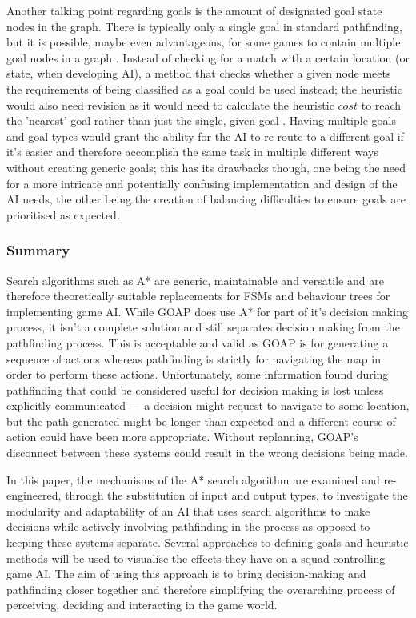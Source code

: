 \documentclass[11pt, a4paper]{article}
\begin{document}
Another talking point regarding goals is the amount of designated goal state nodes in the graph. There is typically only a single goal in standard pathfinding, but it is possible, maybe even advantageous, for some games to contain multiple goal nodes in a graph \parencite[272]{millington2019ai}. Instead of checking for a match with a certain location (or state, when developing AI), a method that checks whether a given node meets the requirements of being classified as a goal could be used instead; the heuristic would also need revision as it would need to calculate the heuristic $cost$ to reach the 'nearest' goal rather than just the single, given goal \parencite[272]{millington2019ai}. Having multiple goals and goal types \parencite[121]{higgins2002generic} would grant the ability for the AI to re-route to a different goal if it's easier and therefore accomplish the same task in multiple different ways without creating generic goals; this has its drawbacks though, one being the need for a more intricate and potentially confusing implementation and design of the AI needs, the other being the creation of balancing difficulties to ensure goals are prioritised as expected.

\subsubsection{Summary}
\label{subsubsec:litReviewSummary}

Search algorithms such as A* are generic, maintainable and versatile and are therefore theoretically suitable replacements for FSMs and behaviour trees for implementing game AI. While GOAP does use A* for part of it's decision making process, it isn't a complete solution and still separates decision making from the pathfinding process. This is acceptable and valid as GOAP is for generating a sequence of actions whereas pathfinding is strictly for navigating the map in order to perform these actions. Unfortunately, some information found during pathfinding that could be considered useful for decision making is lost unless explicitly communicated --- a decision might request to navigate to some location, but the path generated might be longer than expected and a different course of action could have been more appropriate. Without replanning, GOAP's disconnect between these systems could result in the wrong decisions being made.

In this paper, the mechanisms of the A* search algorithm are examined and re-engineered, through the substitution of input and output types, to investigate the modularity and adaptability of an AI that uses search algorithms to make decisions while actively involving pathfinding in the process as opposed to keeping these systems separate. Several approaches to defining goals and heuristic methods will be used to visualise the effects they have on a squad-controlling game AI. The aim of using this approach is to bring decision-making and pathfinding closer together and therefore simplifying the overarching process of perceiving, deciding and interacting in the game world.
\end{document}
